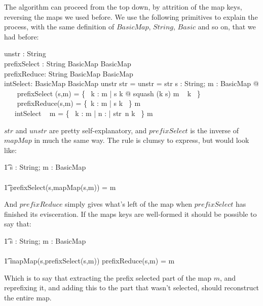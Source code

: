 \documentclass[a4paper,twoside,12pt]{article}
\begin{document}
The algorithm can proceed from the top down, by attrition of the map keys, reversing the maps we used before.
We use the following primitives to explain the process, with the same definition of $BasicMap$, $String$, $Basic$ and so on, that we had before:
\begin{axdef}
	unstr : String \pfun \nat	\\
	prefixSelect : String \cross BasicMap \pfun BasicMap	\\
	prefixReduce: String \cross BasicMap \pfun BasicMap	\\
	intSelect: BasicMap \pfun BasicMap 
\where
	unstr \circ str = \id \nat \land \dom unstr = \ran str
\also
	\forall s : String; m : BasicMap @	\\
	~~~ prefixSelect (s,m) = \{~ k : \dom m | s \prefix k @ squash (k \setminus s) \mapsto m ~ k ~\} \land \\
	~~~ prefixReduce(s,m) = \{~k : \dom m | s \prefix k ~\} \ndres m \land	\\
	~~~intSelect ~ m = \{~ k : \dom m | \exists n : \nat | str~n \prefix k ~\} \dres m
\end{axdef}
$str$ and $unstr$ are pretty self-explanatory, and $prefixSelect$ is the inverse of $mapMap$ in much the same way.  The rule is clumsy to express, but would look like:
\begin{zed}
	\t1 s : String; m : BasicMap	\\
	\vdash	\\
	\t1 prefixSelect(s,mapMap(s,m)) = m
\end{zed}
And $prefixReduce$ simply gives what's left of the map when $prefixSelect$ has finished its evisceration. If the maps keys are well-formed it should be possible to say that:
\begin{zed}
	\t1 s : String; m : BasicMap	\\
	\vdash	\\
	\t1 mapMap(s,prefixSelect(s,m)) \union prefixReduce(s,m) = m
\end{zed}
Which is to say that extracting the prefix selected part of the map $m$, and reprefixing it, and adding this to the part that wasn't selected, should reconstruct the entire map.
\end{document}
